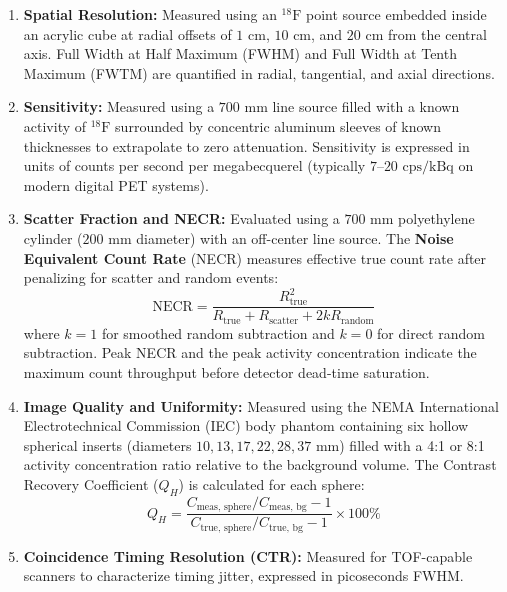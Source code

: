 \documentclass[11pt,a4paper]{article}
\begin{document}
\begin{enumerate}[leftmargin=2em]
    \item \textbf{Spatial Resolution:} Measured using an $^{18}\text{F}$ point source embedded inside an acrylic cube at radial offsets of $1\text{ cm}$, $10\text{ cm}$, and $20\text{ cm}$ from the central axis. Full Width at Half Maximum (FWHM) and Full Width at Tenth Maximum (FWTM) are quantified in radial, tangential, and axial directions.
    \item \textbf{Sensitivity:} Measured using a $700\text{ mm}$ line source filled with a known activity of $^{18}\text{F}$ surrounded by concentric aluminum sleeves of known thicknesses to extrapolate to zero attenuation. Sensitivity is expressed in units of counts per second per megabecquerel (typically $7\text{--}20\text{ cps/kBq}$ on modern digital PET systems).
    \item \textbf{Scatter Fraction and NECR:} Evaluated using a $700\text{ mm}$ polyethylene cylinder ($200\text{ mm}$ diameter) with an off-center line source. The \textbf{Noise Equivalent Count Rate} (NECR) measures effective true count rate after penalizing for scatter and random events:
    \begin{equation}
        \text{NECR} = \frac{R_{\text{true}}^2}{R_{\text{true}} + R_{\text{scatter}} + 2 k R_{\text{random}}}
    \end{equation}
    where $k=1$ for smoothed random subtraction and $k=0$ for direct random subtraction. Peak NECR and the peak activity concentration indicate the maximum count throughput before detector dead-time saturation.
    \item \textbf{Image Quality and Uniformity:} Measured using the NEMA International Electrotechnical Commission (IEC) body phantom containing six hollow spherical inserts (diameters $10, 13, 17, 22, 28, 37\text{ mm}$) filled with a 4:1 or 8:1 activity concentration ratio relative to the background volume. The Contrast Recovery Coefficient ($Q_H$) is calculated for each sphere:
    \begin{equation}
        Q_H = \frac{C_{\text{meas, sphere}} / C_{\text{meas, bg}} - 1}{C_{\text{true, sphere}} / C_{\text{true, bg}} - 1} \times 100\%
    \end{equation}
    \item \textbf{Coincidence Timing Resolution (CTR):} Measured for TOF-capable scanners to characterize timing jitter, expressed in picoseconds FWHM.
\end{enumerate}
\end{document}
